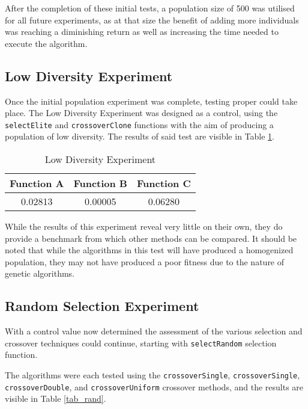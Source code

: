 	After the completion of these initial tests, a population size of 500 was utilised for all future experiments, as at that size the benefit of adding more individuals was reaching a diminishing return as well as increasing the time needed to execute the algorithm.

	\subsection{Low Diversity Experiment}
		Once the initial population experiment was complete, testing proper could take place. The Low Diversity Experiment was designed as a control, using the \texttt{selectElite} and \texttt{crossoverClone} functions with the aim of producing a population of low diversity. The results of said test are visible in Table \ref{tab_low}.
		
		\begin{table}[h]
			\centering
			\caption{Low Diversity Experiment}
			\label{tab_low}
			\begin{tabular}{|c|c|c|}
				\hline
				\textbf{Function A} & \textbf{Function B} & \textbf{Function C} \\ \hline
				0.02813             & 0.00005             & 0.06280             \\ \hline
			\end{tabular}
		\end{table}
	
		While the results of this experiment reveal very little on their own, they do provide a benchmark  from which other methods can be compared. It should be noted that while the algorithms in this test will have produced a homogenized population, they may not have produced a poor fitness due to the nature of genetic algorithms. 
		
		\subsection{Random Selection Experiment}
			With a control value now determined the assessment of the various selection and crossover techniques could continue, starting with \texttt{selectRandom} selection function.
			
			The algorithms were each tested using the \texttt{crossoverSingle}, \texttt{crossoverSingle}, \texttt{crossoverDouble}, and \texttt{crossoverUniform} crossover methods, and the results are visible in Table \ref{tab_rand}.
						
